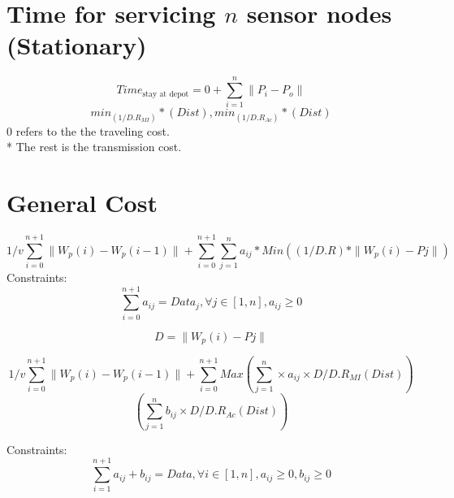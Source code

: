 \documentclass{article}
\begin{document}
\section{Time for servicing $n$ sensor nodes (Stationary)}

\begin{equation}
    \label{TimeEqn_Stationary}
    Time_{\textrm{stay at depot}} = 0 + \sum_{i=1}^{n} \|P_{i}-P_{o}\| 
    \end{equation} 
\begin{equation}
    \label{Transmission}
    min_{(1/D.R_{MI})}*(Dist),min_{(1/D.R_{Ac})}*(Dist)  
\end{equation}
0 refers to the the traveling cost.\\*
The rest is the transmission cost.

\section{General Cost}
\label{GeneralCost_SingleMode}
\begin{equation}
1/v \sum_{i=0}^{n+1} \|W_{p}(i)-W_{p}(i-1)\|+\sum_{i=0}^{n+1}\sum_{j=1}^{n} a_{ij}*Min ((1/D.R)*\|W_{p}(i)-P{j}\|)
\end{equation}
Constraints:
\label{GeneralCostSingle_Constraints}
\begin{equation}
\sum_{i=0}^{n+1} a_{ij} = Data_{j}, \forall j \in [1,n], 
 a_{ij}\geq 0
\end{equation}

\label{Dist_Definition}
\begin{equation}
D = \|W_{p}(i)-P{j}\|
\end{equation}

\label{GeneralCost_DoubleMode}
\begin{equation}
1/v \sum_{i=0}^{n+1} \|W_{p}(i)-W_{p}(i-1)\|+\sum_{i=0}^{n+1}Max(\sum_{j=1}^{n} \times a_{ij}\times D/D.R_{MI}(Dist))  
\end{equation}
\begin{equation}
(\sum_{j=1}^{n} b_{ij}\times D/D.R_{Ac}(Dist))
\end{equation}

Constraints:
\label{GeneralCostDouble_Constraints}
\begin{equation}
\sum_{i=1}^{n+1} a_{ij}+b_{ij}=Data,\forall i \in [1,n], 
 a_{ij}\geq 0,b_{ij}\geq 0
\end{equation}
\end{document}
